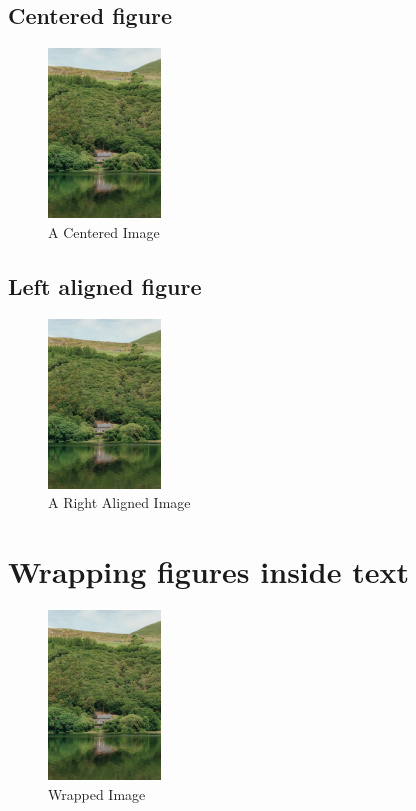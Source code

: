 \documentclass{article}
\begin{document}
\newpage

\subsection{Centered figure}
  \begin{figure}[h!]
  \caption{A Centered Image}
  \centering
  \includegraphics[width=3cm]{shawnanggg-SQ9Q1nvwhlI-unsplash.jpg}
  \end{figure}

\subsection{Left aligned figure}
  \begin{figure}[h!]
  \caption{A Right Aligned Image}
  \raggedleft
  \includegraphics[width=3cm]{shawnanggg-SQ9Q1nvwhlI-unsplash.jpg}
  \end{figure}

\newpage

\section{Wrapping figures inside text}
\begin{figure}
\includegraphics[width=3cm]{shawnanggg-SQ9Q1nvwhlI-unsplash.jpg}
\caption{Wrapped Image}
\end{figure}

\blindtext
\end{document}
